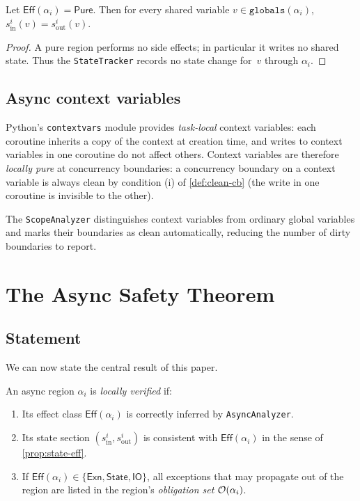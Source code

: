 \documentclass[11pt]{article}
\newcommand{\Epure}{\mathsf{Pure}}           %
\newcommand{\Eexn}{\mathsf{Exn}}             %
\newcommand{\Estate}{\mathsf{State}}         %
\newcommand{\Eio}{\mathsf{IO}}               %
\newcommand{\effectClass}[1]{\mathsf{Eff}(#1)} %
\newcommand{\asyncRegion}[1]{\alpha_{#1}}    %
\begin{document}
\begin{proposition}\label{prop:state-eff}
Let $\effectClass{\asyncRegion{i}} = \Epure$.  Then for every shared
variable $v \in \texttt{globals}(\asyncRegion{i})$,
$s_{\mathrm{in}}^i(v) = s_{\mathrm{out}}^i(v)$.
\end{proposition}
\begin{proof}
A pure region performs no side effects; in particular it writes no shared
state.  Thus the \texttt{StateTracker} records no state change for~$v$
through $\asyncRegion{i}$.
\end{proof}

\subsection{Async context variables}

Python's \texttt{contextvars} module provides \emph{task-local} context
variables: each coroutine inherits a copy of the context at creation time,
and writes to context variables in one coroutine do not affect others.
Context variables are therefore \emph{locally pure} at concurrency
boundaries: a concurrency boundary on a context variable is always clean
by condition (i) of \cref{def:clean-cb} (the write in one coroutine is
invisible to the other).

The \texttt{ScopeAnalyzer} distinguishes context variables from ordinary
global variables and marks their boundaries as clean automatically,
reducing the number of dirty boundaries to report.

\section{The Async Safety Theorem}\label{sec:theorem}

\subsection{Statement}

We can now state the central result of this paper.

\begin{definition}\label{def:locally-verified}
An async region $\asyncRegion{i}$ is \emph{locally verified} if:
\begin{enumerate}[label=(\roman*)]
  \item Its effect class $\effectClass{\asyncRegion{i}}$ is correctly
        inferred by \texttt{AsyncAnalyzer}.
  \item Its state section $(s_{\mathrm{in}}^i, s_{\mathrm{out}}^i)$ is
        consistent with $\effectClass{\asyncRegion{i}}$ in the sense of
        \cref{prop:state-eff}.
  \item If $\effectClass{\asyncRegion{i}} \in \{\Eexn, \Estate, \Eio\}$, all
        exceptions that may propagate out of the region are listed in the
        region's \emph{obligation set} $\oblig(\asyncRegion{i})$.
\end{enumerate}
\end{definition}
\end{document}
